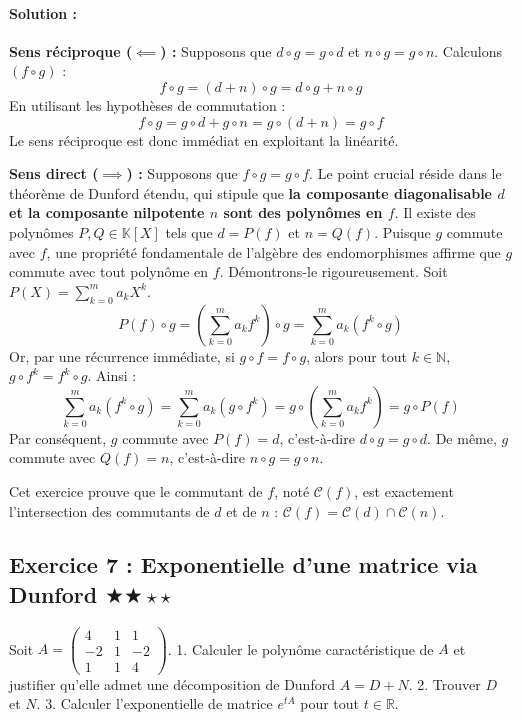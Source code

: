 \documentclass[11pt,a4paper]{article}
\begin{document}
\paragraph*{Solution :}

\textbf{Sens réciproque ($\impliedby$) :}
Supposons que $d \circ g = g \circ d$ et $n \circ g = g \circ n$.
Calculons $(f \circ g)$ :
$$ f \circ g = (d + n) \circ g = d \circ g + n \circ g $$
En utilisant les hypothèses de commutation :
$$ f \circ g = g \circ d + g \circ n = g \circ (d + n) = g \circ f $$
Le sens réciproque est donc immédiat en exploitant la linéarité.

\textbf{Sens direct ($\implies$) :}
Supposons que $f \circ g = g \circ f$.
Le point crucial réside dans le théorème de Dunford étendu, qui stipule que \textbf{la composante diagonalisable $d$ et la composante nilpotente $n$ sont des polynômes en $f$}.
Il existe des polynômes $P, Q \in \mathbb{K}[X]$ tels que $d = P(f)$ et $n = Q(f)$.
Puisque $g$ commute avec $f$, une propriété fondamentale de l'algèbre des endomorphismes affirme que $g$ commute avec tout polynôme en $f$.
Démontrons-le rigoureusement. Soit $P(X) = \sum_{k=0}^m a_k X^k$.
$$ P(f) \circ g = \left( \sum_{k=0}^m a_k f^k \right) \circ g = \sum_{k=0}^m a_k (f^k \circ g) $$
Or, par une récurrence immédiate, si $g \circ f = f \circ g$, alors pour tout $k \in \mathbb{N}$, $g \circ f^k = f^k \circ g$.
Ainsi :
$$ \sum_{k=0}^m a_k (f^k \circ g) = \sum_{k=0}^m a_k (g \circ f^k) = g \circ \left( \sum_{k=0}^m a_k f^k \right) = g \circ P(f) $$
Par conséquent, $g$ commute avec $P(f) = d$, c'est-à-dire $d \circ g = g \circ d$.
De même, $g$ commute avec $Q(f) = n$, c'est-à-dire $n \circ g = g \circ n$.

Cet exercice prouve que le commutant de $f$, noté $\mathcal{C}(f)$, est exactement l'intersection des commutants de $d$ et de $n$ : $\mathcal{C}(f) = \mathcal{C}(d) \cap \mathcal{C}(n)$.

\vspace{1cm}
\subsection*{Exercice 7 : Exponentielle d'une matrice via Dunford $\bigstar\bigstar\star\star$}

Soit $A = \begin{pmatrix} 4 & 1 & 1 \\ -2 & 1 & -2 \\ 1 & 1 & 4 \end{pmatrix}$.
1. Calculer le polynôme caractéristique de $A$ et justifier qu'elle admet une décomposition de Dunford $A = D + N$.
2. Trouver $D$ et $N$.
3. Calculer l'exponentielle de matrice $e^{tA}$ pour tout $t \in \mathbb{R}$.
\end{document}
